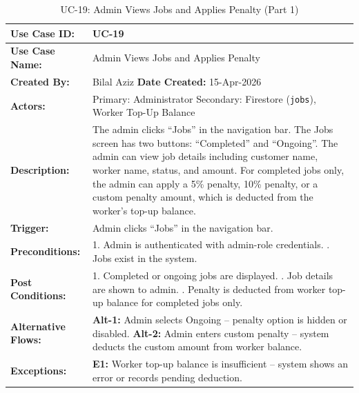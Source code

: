 {\small
\renewcommand{\arraystretch}{1.05}
\begin{table}[H]
\centering
\begin{tabular}{|p{3cm}|p{11.2cm}|}
\hline
\textbf{Use Case ID:} & UC-19 \\ \hline
\textbf{Use Case Name:} & Admin Views Jobs and Applies Penalty \\ \hline
\textbf{Created By:} & Bilal Aziz \hfill \textbf{Date Created:} 15-Apr-2026 \\ \hline
\textbf{Actors:} & Primary: Administrator \quad Secondary: Firestore (\texttt{jobs}), Worker Top-Up Balance \\ \hline
\textbf{Description:} & The admin clicks ``Jobs'' in the navigation bar. The Jobs screen has two buttons: ``Completed'' and ``Ongoing''. The admin can view job details including customer name, worker name, status, and amount. For completed jobs only, the admin can apply a 5\% penalty, 10\% penalty, or a custom penalty amount, which is deducted from the worker's top-up balance. \\ \hline
\textbf{Trigger:} & Admin clicks ``Jobs'' in the navigation bar. \\ \hline
\textbf{Preconditions:} & 1. Admin is authenticated with admin-role credentials. \newline 2. Jobs exist in the system. \\ \hline
\textbf{Post Conditions:} & 1. Completed or ongoing jobs are displayed. \newline 2. Job details are shown to admin. \newline 3. Penalty is deducted from worker top-up balance for completed jobs only. \\ \hline
\textbf{Alternative Flows:} & \textbf{Alt-1:} Admin selects Ongoing -- penalty option is hidden or disabled. \newline \textbf{Alt-2:} Admin enters custom penalty -- system deducts the custom amount from worker balance. \\ \hline
\textbf{Exceptions:} & \textbf{E1:} Worker top-up balance is insufficient -- system shows an error or records pending deduction. \\ \hline
\end{tabular}
\caption*{UC-19: Admin Views Jobs and Applies Penalty (Part 1)}
\end{table}
}

\newpage

